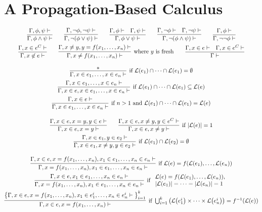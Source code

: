 
\section{A Propagation-Based Calculus}
\label{sect:calculus}

\begin{table}
  \begin{gather*}
    \infer
    {\seqq{\phi \wedge \psi}}
    {\seqq{\phi, \psi}}
    \qquad
    \infer
    {\seqq{ \neg(\phi \vee \psi)}}
    {\seqq{ \neg\phi, \neg\psi}}
    \qquad
    \infer
    {\seqq{\phi \vee \psi}}
    {\seqq{\phi} & \seqq{\psi}}
    \qquad
    \infer
    {\seqq{\neg(\phi \wedge \psi)}}
    {\seqq{\neg\phi} & \seqq{\neg\psi}}
    \qquad
    \infer
    {\seqq{ \neg\neg\phi}}
    {\seqq{\phi}}
    \\
    \infer
    {\seqq{x \not\in e}}
    {\seqq{x \in e^C}}
    \qquad
    \infer[\text{where~} y \text{~is fresh}]
    {\seqq{x \not= f(x_1, \ldots, x_n)}}
    {\seqq{x \not= y, y = f(x_1, \ldots, x_n)}}
    \qquad
    \infer
    {\seqq{}}
    {\seqq{x \in e} & \seqq{x \in e^C}}
    \\[2ex]
    \infer[\text{if~} \lang{e_1} \cap \cdots \cap\lang{e_1} = \emptyset]
    {\seqq{x \in e_1, \ldots, x \in e_n}}
    {*}
    \\
    \infer[\text{if~} \lang{e_1} \cap \cdots \cap\lang{e_1} \subseteq \lang{e}]
    {\seqq{x \in e, x \in e_1, \ldots, x \in e_n}}
    {\seqq{x \in e_1, \ldots, x \in e_n}}
    \\
    \infer[\text{if~} n > 1 \text{~and~} \lang{e_1} \cap \cdots \cap\lang{e_1} = \lang{e}]
    {\seqq{x \in e_1, \ldots, x \in e_n}}
    {\seqq{x \in e}}
    \\[2ex]
    \infer
    {\seqq{x \in e, x = y}}
    {\seqq{x \in e, x = y, y \in e}}
    \qquad
    \infer[\text{if~} |\lang{e}| = 1]
    {\seqq{x \in e, x \not= y}}
    {\seqq{x \in e, x \not= y, y \in e^C}}
    \\
    \infer[\text{if~} \lang{e_1} \cap \lang{e_2} = \emptyset]
    {\seqq{x \in e_1, x \not= y, y \in e_2}}
    {\seqq{x \in e_1, y \in e_2}}
    \\[2ex]
    \infer[\text{if~} \lang{e} = f(\lang{e_1}, \ldots, \lang{e_n})]
    {\seqq{x = f(x_1, \ldots, x_n), x_1 \in e_1, \ldots, x_n \in e_n}}
    {\seqq{x \in e, x = f(x_1, \ldots, x_n), x_1 \in e_1, \ldots, x_n \in e_n}}
    \\
    \infer[\text{if~}
    \begin{array}{l}
      \lang{e} = f(\lang{e_1}, \ldots, \lang{e_n}),
      \\
      |\lang{e_1}| = \cdots = |\lang{e_n}| = 1
    \end{array}]
    {\seqq{x = f(x_1, \ldots, x_n), x_1 \in e_1, \ldots, x_n \in e_n}}
    {\seqq{x \in e, x_1 \in e_1, \ldots, x_n \in e_n}}
    \\
    \infer[\text{if~}
    \bigcup_{i=1}^k \big( \lang{e_1^i} \times \cdots \times \lang{e_n^i} \big) =
    f^{-1}(\lang{e})]
    {\seqq{x \in e, x = f(x_1, \ldots, x_n)}}
    {\big\{\seqq{x \in e, x = f(x_1, \ldots, x_n),
        x_1 \in e_1^i, \ldots, x_n \in e_n^i}\big\}_{i=1}^k}
  \end{gather*}
  

\end{table}
